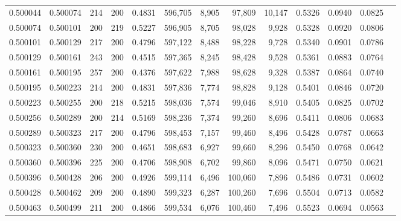 \begin{tabular}{rrrrrrrrrrrrr}
0.500044 & 0.500074 &    214 & 200 &                                     0.4831 & 596,705 &   8,905 &  97,809 &  10,147 & 0.5326 & 0.0940 & 0.0825 \\
0.500074 & 0.500101 &    200 & 219 &                                     0.5227 & 596,905 &   8,705 &  98,028 &   9,928 & 0.5328 & 0.0920 & 0.0806 \\
0.500101 & 0.500129 &    217 & 200 &                                     0.4796 & 597,122 &   8,488 &  98,228 &   9,728 & 0.5340 & 0.0901 & 0.0786 \\
0.500129 & 0.500161 &    243 & 200 &                                     0.4515 & 597,365 &   8,245 &  98,428 &   9,528 & 0.5361 & 0.0883 & 0.0764 \\
0.500161 & 0.500195 &    257 & 200 &                                     0.4376 & 597,622 &   7,988 &  98,628 &   9,328 & 0.5387 & 0.0864 & 0.0740 \\
0.500195 & 0.500223 &    214 & 200 &                                     0.4831 & 597,836 &   7,774 &  98,828 &   9,128 & 0.5401 & 0.0846 & 0.0720 \\
0.500223 & 0.500255 &    200 & 218 &                                     0.5215 & 598,036 &   7,574 &  99,046 &   8,910 & 0.5405 & 0.0825 & 0.0702 \\
0.500256 & 0.500289 &    200 & 214 &                                     0.5169 & 598,236 &   7,374 &  99,260 &   8,696 & 0.5411 & 0.0806 & 0.0683 \\
0.500289 & 0.500323 &    217 & 200 &                                     0.4796 & 598,453 &   7,157 &  99,460 &   8,496 & 0.5428 & 0.0787 & 0.0663 \\
0.500323 & 0.500360 &    230 & 200 &                                     0.4651 & 598,683 &   6,927 &  99,660 &   8,296 & 0.5450 & 0.0768 & 0.0642 \\
0.500360 & 0.500396 &    225 & 200 &                                     0.4706 & 598,908 &   6,702 &  99,860 &   8,096 & 0.5471 & 0.0750 & 0.0621 \\
0.500396 & 0.500428 &    206 & 200 &                                     0.4926 & 599,114 &   6,496 & 100,060 &   7,896 & 0.5486 & 0.0731 & 0.0602 \\
0.500428 & 0.500462 &    209 & 200 &                                     0.4890 & 599,323 &   6,287 & 100,260 &   7,696 & 0.5504 & 0.0713 & 0.0582 \\
0.500463 & 0.500499 &    211 & 200 &                                     0.4866 & 599,534 &   6,076 & 100,460 &   7,496 & 0.5523 & 0.0694 & 0.0563 \\

\end{tabular}
